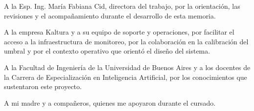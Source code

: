 \documentclass[
    11pt,
    spanish,
    singlespacing,
    parskip,
    headsepline,
    bookmarks=true,
    unicode=true,
    pdftoolbar=true,
    pdfmenubar=true,
    pdffitwindow=false,
    colorlinks=true,
    linkcolor=blue,
    citecolor=blue,
    urlcolor=blue
]{MastersDoctoralThesis}
\begin{document}



\frontmatter %
\pagestyle{plain} %


\begin{abstract}
\addchaptertocentry{\abstractname} %
En la presente memoria se describe el diseño y la implementación de un sistema de detección de anomalías para un servicio de televisión por protocolo de internet basado en interfaces de programación de aplicaciones. El trabajo fue desarrollado para una empresa proveedora de plataformas de video sobre infraestructura en la nube. 

Para su concreción, fue necesaria la aplicación de aprendizaje profundo sobre series temporales mediante un autoencoder con redes neuronales recurrentes de memoria a largo plazo, junto con técnicas de ingeniería de características y de integración con sistemas de observabilidad de software como Prometheus, Grafana y Opsgenie.
\end{abstract}


\begin{acknowledgements}
A la Esp. Ing. María Fabiana Cid, directora del trabajo, por la orientación, las revisiones y el acompañamiento durante el desarrollo de esta memoria.

A la empresa Kaltura y a su equipo de soporte y operaciones, por facilitar el acceso a la infraestructura de monitoreo, por la colaboración en la calibración del umbral y por el contexto operativo que orientó el diseño del sistema.

A la Facultad de Ingeniería de la Universidad de Buenos Aires y a los docentes de la Carrera de Especialización en Inteligencia Artificial, por los conocimientos que sustentaron este proyecto.

A mi madre y a compañeros, quienes me apoyaron durante el cursado.
\end{acknowledgements}
\end{document}
